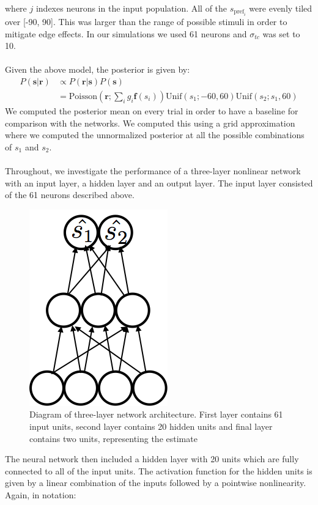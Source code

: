 \documentclass{article} %
\begin{document}
\\
where $j$ indexes neurons in the input population. All of the $s_{\text{pref}_i}$ were evenly tiled over [-90, 90]. This was larger than the range of possible stimuli in order to mitigate edge effects. In our simulations we used 61 neurons and $\sigma_{tc}$ was set to 10.
\\
\\
Given the above model, the posterior is given by:
\begin{equation}
\begin{aligned}
	P(\mathbf{s}|\mathbf{r}) &\propto  P(\mathbf{r}|\mathbf{s})P(\mathbf{s})\\
	&= \text{Poisson}(\mathbf{r}; \sum_i g_i \mathbf{f}(s_i)) \text{Unif}(s_1; -60, 60) \text{Unif}(s_2; s_1, 60)
\end{aligned}
\end{equation}
We computed the posterior mean on every trial in order to have a baseline for comparison with the networks. We computed this using a grid approximation where we computed the unnormalized posterior at all the possible combinations of $s_1$ and $s_2$.
\\
\\
Throughout, we investigate the performance of a three-layer nonlinear network with an input layer, a hidden layer and an output layer. The input layer consisted of the 61 neurons described above. 
\begin{figure}
\centering
\includegraphics[width = .3\textwidth]{Network.png}
\caption{Diagram of three-layer network architecture. First layer contains 61 input units, second layer contains 20 hidden units and final layer contains two units, representing the estimate}
\end{figure}
The neural network then included a hidden layer with 20 units which are fully connected to all of the input units. The activation function for the hidden units is given by a linear combination of the inputs followed by a pointwise nonlinearity. Again, in notation:
\end{document}
